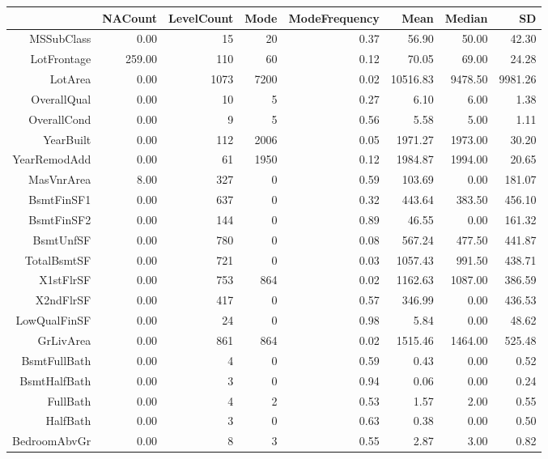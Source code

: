 \begin{table}[ht]
\centering
\begin{tabular}{rrrrrrrr}
  \hline
 & NACount & LevelCount & Mode & ModeFrequency & Mean & Median & SD \\ 
  \hline
MSSubClass & 0.00 &  15 &  20 & 0.37 & 56.90 & 50.00 & 42.30 \\ 
  LotFrontage & 259.00 & 110 &  60 & 0.12 & 70.05 & 69.00 & 24.28 \\ 
  LotArea & 0.00 & 1073 & 7200 & 0.02 & 10516.83 & 9478.50 & 9981.26 \\ 
  OverallQual & 0.00 &  10 &   5 & 0.27 & 6.10 & 6.00 & 1.38 \\ 
  OverallCond & 0.00 &   9 &   5 & 0.56 & 5.58 & 5.00 & 1.11 \\ 
  YearBuilt & 0.00 & 112 & 2006 & 0.05 & 1971.27 & 1973.00 & 30.20 \\ 
  YearRemodAdd & 0.00 &  61 & 1950 & 0.12 & 1984.87 & 1994.00 & 20.65 \\ 
  MasVnrArea & 8.00 & 327 &   0 & 0.59 & 103.69 & 0.00 & 181.07 \\ 
  BsmtFinSF1 & 0.00 & 637 &   0 & 0.32 & 443.64 & 383.50 & 456.10 \\ 
  BsmtFinSF2 & 0.00 & 144 &   0 & 0.89 & 46.55 & 0.00 & 161.32 \\ 
  BsmtUnfSF & 0.00 & 780 &   0 & 0.08 & 567.24 & 477.50 & 441.87 \\ 
  TotalBsmtSF & 0.00 & 721 &   0 & 0.03 & 1057.43 & 991.50 & 438.71 \\ 
  X1stFlrSF & 0.00 & 753 & 864 & 0.02 & 1162.63 & 1087.00 & 386.59 \\ 
  X2ndFlrSF & 0.00 & 417 &   0 & 0.57 & 346.99 & 0.00 & 436.53 \\ 
  LowQualFinSF & 0.00 &  24 &   0 & 0.98 & 5.84 & 0.00 & 48.62 \\ 
  GrLivArea & 0.00 & 861 & 864 & 0.02 & 1515.46 & 1464.00 & 525.48 \\ 
  BsmtFullBath & 0.00 &   4 &   0 & 0.59 & 0.43 & 0.00 & 0.52 \\ 
  BsmtHalfBath & 0.00 &   3 &   0 & 0.94 & 0.06 & 0.00 & 0.24 \\ 
  FullBath & 0.00 &   4 &   2 & 0.53 & 1.57 & 2.00 & 0.55 \\ 
  HalfBath & 0.00 &   3 &   0 & 0.63 & 0.38 & 0.00 & 0.50 \\ 
  BedroomAbvGr & 0.00 &   8 &   3 & 0.55 & 2.87 & 3.00 & 0.82 \\ 

\end{tabular}
\end{table}
